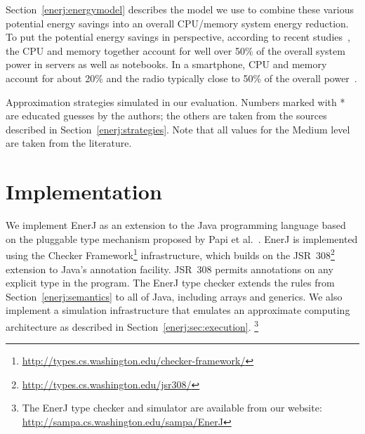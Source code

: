 \medskip
\noindent
Section~\ref{enerj:energymodel} describes the model we use to combine these
various potential energy savings into an overall CPU/memory system energy
reduction.
To put the potential energy savings in perspective, according to
recent studies~\cite{googlepower, aqeel}, the CPU and memory together account
for well over 50\% of the overall system power in servers as well as
notebooks. In a smartphone, CPU and memory account for about 20\% and
the radio typically close to 50\% of the overall
power~\cite{carroll2010}.






\begin{table}
\small
\begin{centering}

\end{centering}
\caption{Approximation strategies simulated in our evaluation.
Numbers marked with * are educated guesses by the authors; the others
are taken from the sources described in Section~\ref{enerj:strategies}. Note that
all values for the Medium level are taken from the literature.}
\label{enerj:table:approximations}
\end{table}




\section{Implementation}
\label{enerj:sec:impl}

We implement EnerJ as an extension to the Java
programming language based on the
pluggable type mechanism proposed by Papi et al.~\cite{pap2008}.
EnerJ is implemented using the
Checker Framework\footnote{\url{http://types.cs.washington.edu/checker-framework/}}
infrastructure,
which builds on the
JSR~308\footnote{\url{http://types.cs.washington.edu/jsr308/}}
extension to Java's annotation facility. JSR~308 permits annotations on
any explicit type in the program.
The EnerJ type checker extends the rules from Section~\ref{enerj:semantics} to all of
Java, including arrays and generics.
We also implement a simulation infrastructure that emulates an
approximate computing architecture as described in Section~\ref{enerj:sec:execution}.
\footnote{The EnerJ type checker and simulator
are available from
our website:
\url{http://sampa.cs.washington.edu/sampa/EnerJ}
}

